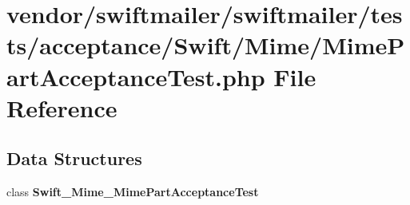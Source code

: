\section{vendor/swiftmailer/swiftmailer/tests/acceptance/\+Swift/\+Mime/\+Mime\+Part\+Acceptance\+Test.php File Reference}
\label{_mime_2_mime_part_acceptance_test_8php}
\subsection*{Data Structures}
\begin{DoxyCompactItemize}
\item 
class {\bf Swift\+\_\+\+Mime\+\_\+\+Mime\+Part\+Acceptance\+Test}
\end{DoxyCompactItemize}
